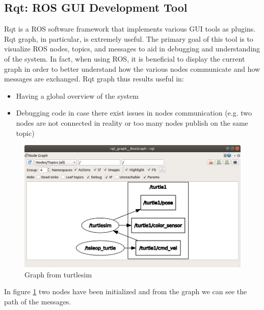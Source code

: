 \subsection{Rqt: ROS GUI Development Tool}
Rqt is a ROS software framework that implements various GUI tools as plugins.
Rqt graph, in particular, is extremely useful.
The primary goal of this tool is to visualize ROS nodes, topics, and messages to aid in debugging and understanding of the system. In fact, when using ROS, it is beneficial to display the current graph in order to better understand how the various nodes communicate and how messages are exchanged.
Rqt graph thus results useful in:
\begin{itemize}
    \item Having a global overview of the system
    \item Debugging code in case there exist issues in nodes communication (e.g. two nodes are not connected in reality or too many nodes publish on the same topic)
\end{itemize}
\begin{figure}[H]
    \centering
    \includegraphics[scale=0.3]{Images/Chapter 2/rqt_graph_turtlesim.png}
    \caption{Graph from turtlesim}
    \label{fig:rqtgraph}
\end{figure}
In figure \ref{fig:rqtgraph} two nodes have been initialized and from the graph we can see the path of the messages.

